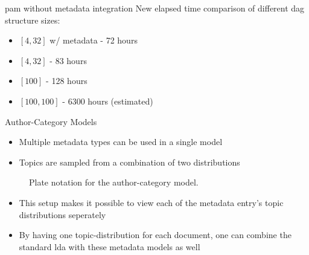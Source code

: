 \begin{frame}{\insertsection}{\gls{pam} without metadata integration}
	New elapsed time comparison of different \gls{dag} structure sizes:
	\begin{itemize}
		\item $[ 4, 32 ]$ w/ metadata - 72 hours
		\item $[ 4, 32 ]$ - 83 hours
		\item $[ 100 ]$ - 128 hours
		\item $[ 100, 100]$ - 6300 hours (estimated)
	\end{itemize}
\end{frame}

\begin{frame}{\insertsection}{Author-Category Models}
	\begin{itemize}
		\item Multiple metadata types can be used in a single model
		\item Topics are sampled from a combination of two distributions
	\end{itemize}
	\begin{figure}
		\centering
		\resizebox{0.35\columnwidth}{!}{%
			
		}
		\caption{Plate notation for the author-category model.}
	\end{figure}
	\begin{itemize}
		\item<2> This setup makes it possible to view each of the metadata entry's topic distributions seperately
		\item<3> By having one topic-distribution for each document, one can combine the standard \gls{lda} with these metadata models as well
	\end{itemize}
\end{frame}

